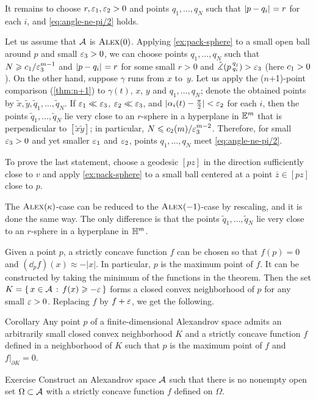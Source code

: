 It remains to choose $r,\varepsilon_1,\varepsilon_2>0$ and points $q_1,\dots, q_N$ such that $\dist{p}{q_i}{}=r$ for each $i$, and \ref{eq:angle-ne-pi/2} holds.

Let us assume that $\mathcal{A}$ is $\textup{\textsc{Alex}}(0)$.
Applying \ref{ex:pack-sphere} to a small open ball around $p$ and small $\varepsilon_3>0$,
we can choose points $q_1,\dots,q_N$ such that $N\geqslant c_1/\varepsilon_3^{m-1}$ and $\dist{p}{q_i}{}=r$ for some small $r>0$
and $\tilde\measuredangle(p\,{}^{q_j}_{q_i})>\varepsilon_3$ (here $c_1>0$).
On the other hand, suppose $\gamma$ runs from $x$ to~$y$.
Let us apply the ($n$+1)-point comparison (\ref{thm:n+1}) to $\gamma(t)$, $x$, $y$ and $q_1,\dots,q_N$;
denote the obtained points by $\tilde x, \tilde y,\tilde q_1,\dots,\tilde q_N$.
If $\varepsilon_1\ll \varepsilon_3$, $\varepsilon_2\ll \varepsilon_3$, and
$|\alpha_i(t)-\tfrac\pi2|<\varepsilon_2$ for each $i$, then the points $\tilde q_1,\dots,\tilde q_N$ lie very close to an $r$-sphere in a hyperplane in $\mathbb{E}^m$ that is perpendicular to $[\tilde x\tilde y]$;
in particular, $N\leqslant c_2(m)/\varepsilon_3^{m-2}$.
Therefore, for small $\varepsilon_3>0$ and yet smaller $\varepsilon_1$ and $\varepsilon_2$, points $q_1,\dots,q_N$ meet \ref{eq:angle-ne-pi/2}.


To prove the last statement, choose a geodesic $[pz]$ in the direction sufficiently close to $v$ and apply \ref{ex:pack-sphere} to a small ball centered at a point $\bar z\in [pz]$ close to $p$.

The $\textup{\textsc{Alex}}(\kappa)$-case can be reduced to the $\textup{\textsc{Alex}}(-1)$-case by rescaling, and it is done the same way.
The only difference is that the points $\tilde q_1,\dots,\tilde q_N$ lie very close to an $r$-sphere in a hyperplane in $\mathbb{H}^m$.
\qeds

Given a point $p$, a strictly concave function $f$ can be chosen so that
$f(p)=0$ and $(\dd_p f)(x)\approx-|x|$.
In particular, $p$ is the maximum point of $f$.
It can be constructed by taking the minimum of the functions in the theorem.
Then the set $K=\set{x\in\spc{A}}{f(x)\ge -\eps}$ forms a closed convex neighborhood of $p$ for any small $\varepsilon>0$.
Replacing $f$ by $f+\varepsilon$, we get the following.

\begin{thm}{Corollary}\label{cor:convex-nbhd}
Any point $p$ of a finite-dimensional Alexandrov space admits an arbitrarily small closed convex neighborhood $K$ and a strictly concave function $f$ defined in a neighborhood of $K$ such that $p$ is the maximum point of $f$
and $f|_{\partial K}=0$.
\end{thm}


\begin{thm}{Exercise}\label{ex:no-conc}
Construct an Alexandrov space $\mathcal{A}$ such that there is no nonempty open set $\Omega\subset \mathcal{A}$ with a strictly concave function $f$ defined on $\Omega$.
\end{thm}

